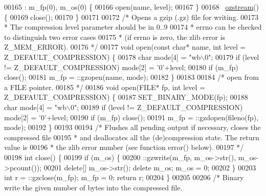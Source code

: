 \begin{DoxyCode}
00165             : m\_fp(0), m\_os(0) \{
00166             open(name, level);
00167         \}
00168         ~\hyperlink{classozstream}{ozstream}() \{
00169             close();
00170         \}
00171 
00172         \textcolor{comment}{/* Opens a gzip (.gz) file for writing.}
00173 \textcolor{comment}{         * The compression level parameter should be in 0..9}
00174 \textcolor{comment}{         * errno can be checked to distinguish two error cases}
00175 \textcolor{comment}{         * (if errno is zero, the zlib error is Z\_MEM\_ERROR).}
00176 \textcolor{comment}{         */}
00177         \textcolor{keywordtype}{void} open(\textcolor{keyword}{const} \textcolor{keywordtype}{char}* name, \textcolor{keywordtype}{int} level = Z\_DEFAULT\_COMPRESSION) \{
00178             \textcolor{keywordtype}{char} mode[4] = \textcolor{stringliteral}{"wb\(\backslash\)0"};
00179             \textcolor{keywordflow}{if} (level != Z\_DEFAULT\_COMPRESSION) mode[2] = \textcolor{charliteral}{'0'}+level;
00180             \textcolor{keywordflow}{if} (m\_fp) close();
00181             m\_fp = ::gzopen(name, mode);
00182         \}
00183 
00184         \textcolor{comment}{/* open from a FILE pointer.}
00185 \textcolor{comment}{         */}
00186         \textcolor{keywordtype}{void} open(FILE* fp, \textcolor{keywordtype}{int} level = Z\_DEFAULT\_COMPRESSION) \{
00187             SET\_BINARY\_MODE(fp);
00188             \textcolor{keywordtype}{char} mode[4] = \textcolor{stringliteral}{"wb\(\backslash\)0"};
00189             \textcolor{keywordflow}{if} (level != Z\_DEFAULT\_COMPRESSION) mode[2] = \textcolor{charliteral}{'0'}+level;
00190             \textcolor{keywordflow}{if} (m\_fp) close();
00191             m\_fp = ::gzdopen(fileno(fp), mode);
00192         \}
00193 
00194         \textcolor{comment}{/* Flushes all pending output if necessary, closes the compressed file}
00195 \textcolor{comment}{         * and deallocates all the (de)compression state. The return value is}
00196 \textcolor{comment}{         * the zlib error number (see function error() below).}
00197 \textcolor{comment}{         */}
00198         \textcolor{keywordtype}{int} close() \{
00199             \textcolor{keywordflow}{if} (m\_os) \{
00200                 ::gzwrite(m\_fp, m\_os->str(), m\_os->pcount());
00201                 \textcolor{keyword}{delete}[] m\_os->str(); \textcolor{keyword}{delete} m\_os; m\_os = 0;
00202             \}
00203             \textcolor{keywordtype}{int} r = ::gzclose(m\_fp); m\_fp = 0; \textcolor{keywordflow}{return} r;
00204         \}
00205 
00206         \textcolor{comment}{/* Binary write the given number of bytes into the compressed file.}

\end{DoxyCode}
